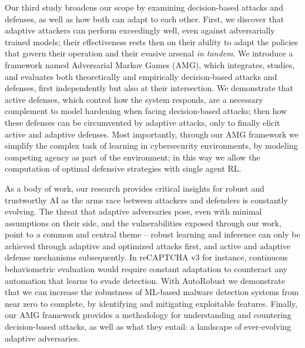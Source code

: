 Our third study broadens our scope by examining decision-based attacks and defenses, as well as how both can adapt to each other.
First, we discover that adaptive attackers can perform exceedingly well, even against adversarially trained models; their effectiveness rests then on their ability to adapt the policies that govern their operation and their evasive arsenal \textit{in tandem}.
We introduce a framework named Adversarial Markov Games (AMG), which integrates, studies, and evaluates both theoretically and empirically decision-based attacks and defenses, first independently but also at their intersection.
We demonstrate that active defenses, which control how the system responds, are a necessary complement to model hardening when facing decision-based attacks; then how these defenses can be circumvented by adaptive attacks, only to finally elicit active and adaptive defenses.
Most importantly, through our AMG framework we simplify the complex task of learning in cybersecurity environments, by modeling competing agency as part of the environment; in this way we allow the computation of optimal defensive strategies with single agent \gls{RL}.

As a body of work, our research provides critical insights for robust and trustworthy \gls{AI} as the arms race between attackers and defenders is constantly evolving.
The threat that adaptive adversaries pose, even with minimal assumptions on their side, and the vulnerabilities exposed through our work, point to a common and central theme -- robust learning and inference can only be achieved through adaptive and optimized attacks first, and active and adaptive defense mechanisms subsequently.
In reCAPTCHA v3 for instance, continuous behaviometric evaluation would require constant adaptation to counteract any automation that learns to evade detection.
With AutoRobust we demonstrate that we can increase the robustness of ML-based malware detection systems from near zero to complete, by identifying and mitigating exploitable features.
Finally, our AMG framework provides a methodology for understanding and countering decision-based attacks, as well as what they entail: a landscape of ever-evolving adaptive adversaries.

